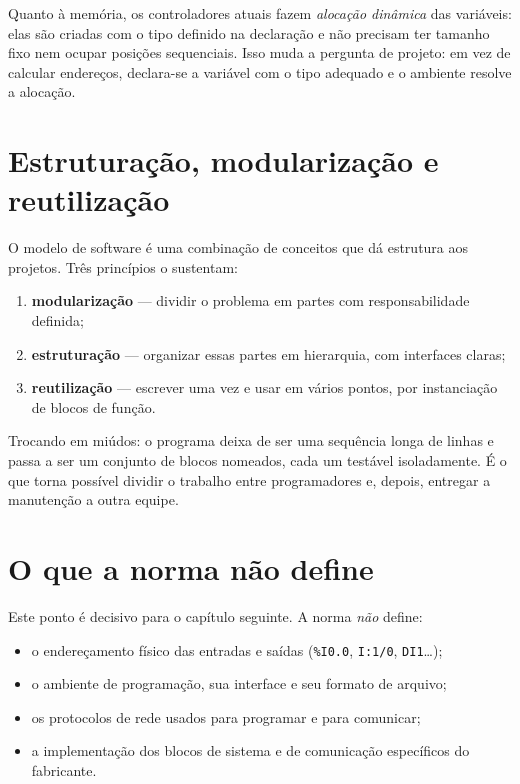Quanto à memória, os controladores atuais fazem \emph{alocação dinâmica} das variáveis: elas são
criadas com o tipo definido na declaração e não precisam ter tamanho fixo nem ocupar posições
sequenciais. Isso muda a pergunta de projeto: em vez de calcular endereços, declara-se a variável
com o tipo adequado e o ambiente resolve a alocação.

\section{Estruturação, modularização e reutilização}

O modelo de software é uma combinação de conceitos que dá estrutura aos projetos. Três princípios o
sustentam:

\begin{enumerate}
  \item \textbf{modularização} --- dividir o problema em partes com responsabilidade definida;
  \item \textbf{estruturação} --- organizar essas partes em hierarquia, com interfaces claras;
  \item \textbf{reutilização} --- escrever uma vez e usar em vários pontos, por instanciação de
        blocos de função.
\end{enumerate}

Trocando em miúdos: o programa deixa de ser uma sequência longa de linhas e passa a ser um conjunto
de blocos nomeados, cada um testável isoladamente. É o que torna possível dividir o trabalho entre
programadores e, depois, entregar a manutenção a outra equipe.

\section{O que a norma não define}

Este ponto é decisivo para o capítulo seguinte. A norma \emph{não} define:

\begin{itemize}
  \item o endereçamento físico das entradas e saídas (\texttt{\%I0.0}, \texttt{I:1/0},
        \texttt{DI1}\ldots);
  \item o ambiente de programação, sua interface e seu formato de arquivo;
  \item os protocolos de rede usados para programar e para comunicar;
  \item a implementação dos blocos de sistema e de comunicação específicos do fabricante.
\end{itemize}


